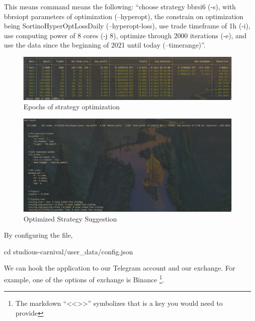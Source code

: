 \documentclass[
12pt,				%
openright,			%
oneside,			%
a4paper,			%
brazil,				%
english,			%
]{abntex2}
\begin{document}
This means command means the following: ``choose strategy bbrsi6 (-s), with bbrsiopt parameters of optimization (--hyperopt), the constrain on optimization being SortinoHyperOptLossDaily (--hyperopt-loss), use trade timeframe of 1h (-i), use computing power of 8 cores (-j 8), optimize through 2000 iterations (-e), and use the data since the beginning of 2021 until today (--timerange)''.

\begin{figure}[ht]
  \centering
    \caption{\label{fig:freqtrade-running} Epochs of strategy optimization}
  \includegraphics[width=\linewidth]{Imagens/freqtrade2.jpeg}
\end{figure}
\begin{figure}[ht]
  \centering
    \caption{\label{fig:freqtrade-running} Optimized Strategy Suggestion}
  \includegraphics[width=\linewidth]{Imagens/freqtrade3.jpeg}
\end{figure}

By configuring the file,
\begin{shell}
cd studious-carnival/user_data/config.json
\end{shell}

We can hook the application to our Telegram account and our exchange. For example, one of the options of exchange is Binance \footnote{The markdown ``<<>>'' symbolizes that is a key you would need to provide}.
\end{document}
